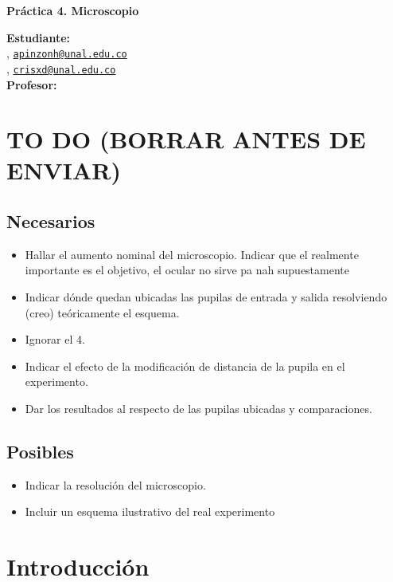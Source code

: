 \documentclass[letterpaper]{article}
\begin{document}
\begin{Large}
    \textsf{\textbf{Práctica 4. Microscopio}}
\end{Large}

\vspace{1ex}

\textsf{\textbf{Estudiante:}} \\
, \href{mailto:apinzonh@unal.edu.co}{\texttt{apinzonh@unal.edu.co}}\\
, \href{mailto:al@unal.edu.co}{\texttt{crisxd@unal.edu.co}}\\
\textsf{\textbf{Profesor:}} 

\vspace{2ex}

\section*{TO DO (BORRAR ANTES DE ENVIAR)}
\subsection*{Necesarios}
\begin{itemize}
    \item Hallar el aumento nominal del microscopio. Indicar que el realmente importante es el objetivo, el ocular no sirve pa nah supuestamente
    \item Indicar dónde quedan ubicadas las pupilas de entrada y salida resolviendo (creo) teóricamente el esquema.
    \item Ignorar el 4.
    \item Indicar el efecto de la modificación de distancia de la pupila en el experimento.
    \item Dar los resultados al respecto de las pupilas ubicadas y comparaciones.
\end{itemize}
\subsection*{Posibles}
\begin{itemize}
    \item Indicar la resolución del microscopio.
    \item Incluir un esquema ilustrativo del real experimento
\end{itemize}

\section*{\textsf{Introducción}}
\end{document}
